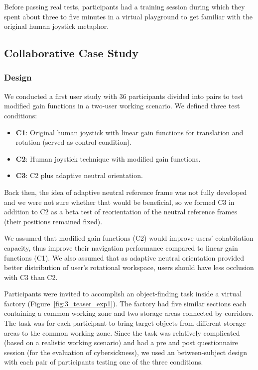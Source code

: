 Before passing real tests, participants had a training session during which they spent about three to five minutes in a virtual playground to get familiar with the original human joystick metaphor.

\subsection{Collaborative Case Study}
\subsubsection{Design}
We conducted a first user study \citep{Chen2015Cohab} with 36 participants divided into pairs to test modified gain functions in a two-user working scenario. We defined three test conditions:

\begin{itemize}
  \item \textbf{C1}: Original human joystick with linear gain functions for translation and rotation (served as control condition).
  \item \textbf{C2}: Human joystick technique with modified gain functions.
  \item \textbf{C3}: C2 plus adaptive neutral orientation.
\end{itemize}

Back then, the idea of adaptive neutral reference frame was not fully developed and we were not sure whether that would be beneficial, so we formed C3 in addition to C2 as a beta test of reorientation of the neutral reference frames (their positions remained fixed).

We assumed that modified gain functions (C2) would improve users' cohabitation capacity, thus improve their navigation performance compared to linear gain functions (C1). We also assumed that as adaptive neutral orientation provided better distribution of user's rotational workspace, users should have less occlusion with C3 than C2.

Participants were invited to accomplish an object-finding task inside a virtual factory (Figure~\ref{fig:3_teaser_exp1}). The factory had five similar sections each containing a common working zone and two storage areas connected by corridors. The task was for each participant to bring target objects from different storage areas to the common working zone. Since the task was relatively complicated (based on a realistic working scenario) and had a pre and post questionnaire session (for the evaluation of cybersickness), we used an between-subject design with each pair of participants testing one of the three conditions.

